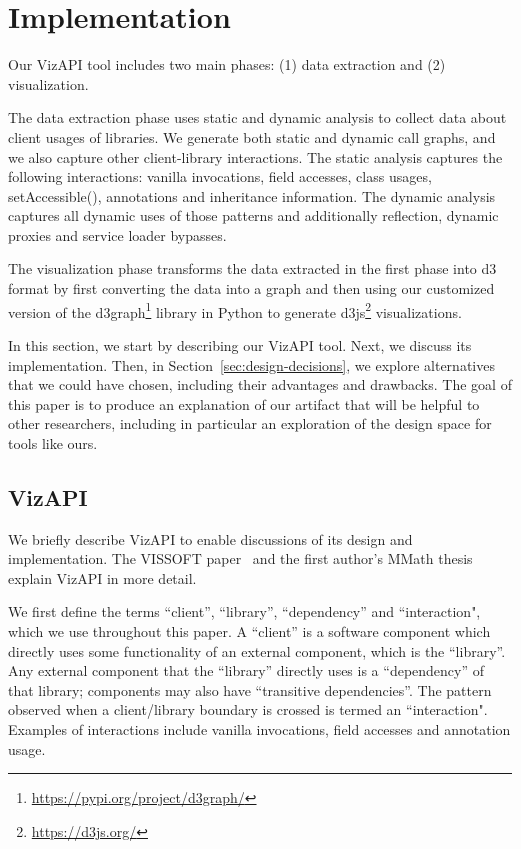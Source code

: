 \section{Implementation}
\label{sec:implementation}
Our VizAPI tool includes two main phases: (1) data extraction and (2)
visualization. 

The data extraction phase uses static and dynamic
analysis to collect data about client usages of libraries. We generate both static and
dynamic call graphs, and we also capture other client-library interactions. The static analysis captures the
following interactions: vanilla invocations, field accesses, class usages,
setAccessible(), annotations and inheritance information. The dynamic
analysis captures all dynamic uses of those patterns and additionally
reflection, dynamic proxies and service loader bypasses.

The visualization phase transforms the data extracted in the first phase into d3 format by first converting the data into a graph and then using our customized version
of the d3graph\footnote{\url{https://pypi.org/project/d3graph/}} library in Python to generate d3js\footnote{\url{https://d3js.org/}}
visualizations. 

In this section, we start by describing our VizAPI
tool. Next, we discuss its implementation. Then, in Section~\ref{sec:design-decisions}, we explore
alternatives that we could have chosen, including their advantages and
drawbacks.  The goal of this paper is to produce an explanation of our
artifact that will be helpful to other researchers, including in
particular an exploration of the design space for tools like ours.

\subsection{VizAPI}
We briefly describe VizAPI to enable discussions of its design and implementation.
The VISSOFT paper~\cite{venkatanarayanan22:_vizap}
and the first author's MMath thesis~\cite{venkatanarayanan22:_study_lever_api_usage_patter} explain VizAPI in more detail.

We first define the terms ``client'', ``library'', ``dependency'' and ``interaction", which we use throughout this paper. A ``client'' is a software component which directly uses some functionality of an external component, which is the ``library''. Any external component that the ``library'' directly uses is a ``dependency'' of that library; components may also have ``transitive dependencies''. The pattern observed when a client/library boundary is crossed is termed an ``interaction". Examples of interactions include vanilla invocations, field accesses and annotation usage.

